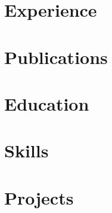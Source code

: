 \documentclass[english,a4paper,10pt]{article}
\begin{document}
\thispagestyle{firstpage}

% 

\section{Experience}


\section{Publications}


\section{Education}


\section{Skills}


\section{Projects}


\end{document}
